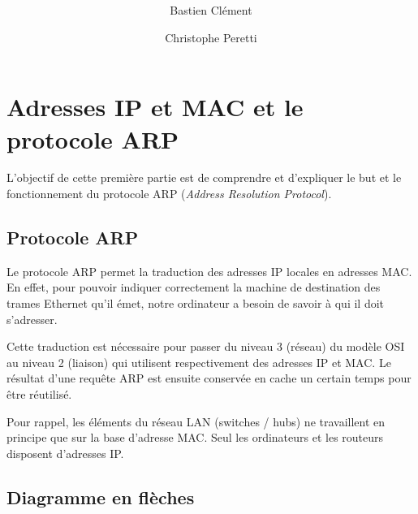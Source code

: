 \documentclass[11pt,a4paper]{article}
\author{Bastien Clément \and Christophe Peretti}
\title{{\normalsize \doccourse} \\ \doctitle }
\begin{document}
\maketitle
\vspace{1em}

\section{Adresses IP et MAC et le protocole ARP}

L'objectif de cette première partie est de comprendre et d'expliquer le but et le fonctionnement du protocole ARP (\textit{Address Resolution Protocol}).

\subsection{Protocole ARP}

Le protocole ARP permet la traduction des adresses IP locales en adresses MAC. En effet, pour pouvoir indiquer correctement la machine de destination des trames Ethernet qu'il émet, notre ordinateur a besoin de savoir à qui il doit s'adresser.

Cette traduction est nécessaire pour passer du niveau 3 (réseau) du modèle OSI au niveau 2 (liaison) qui utilisent respectivement des adresses IP et MAC. Le résultat d'une requête ARP est ensuite conservée en cache un certain temps pour être réutilisé.

Pour rappel, les éléments du réseau LAN (switches / hubs) ne travaillent en principe que sur la base d'adresse MAC. Seul les ordinateurs et les routeurs disposent d'adresses IP.

\subsection{Diagramme en flèches}

\begin{center}
\end{center}
\end{document}
